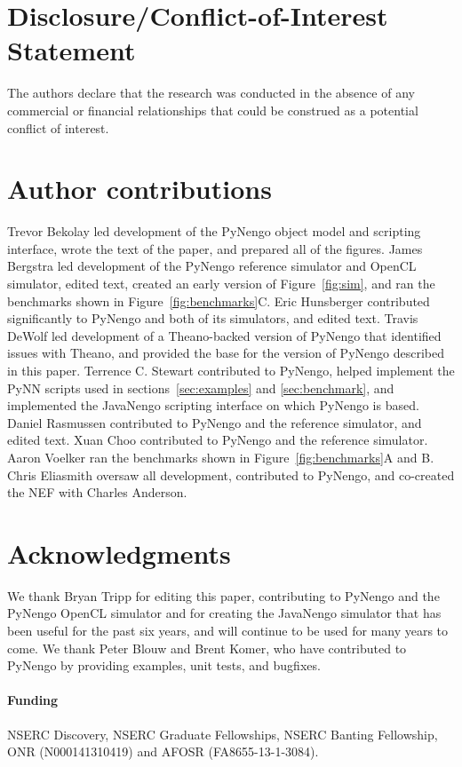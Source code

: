 \documentclass{frontiersSCNS}
\begin{document}
\section*{Disclosure/Conflict-of-Interest Statement}

The authors declare that the research was conducted in the absence of
any commercial or financial relationships that could be construed as a
potential conflict of interest.

\section*{Author contributions}

Trevor Bekolay led development of the
PyNengo object model and scripting interface,
wrote the text of the paper,
and prepared all of the figures.
James Bergstra led development of
the PyNengo reference simulator and OpenCL simulator,
edited text, created an early version
of Figure~\ref{fig:sim},
and ran the benchmarks shown in
Figure~\ref{fig:benchmarks}C.
Eric Hunsberger contributed significantly
to PyNengo and both of its simulators, and edited text.
Travis DeWolf led development
of a Theano-backed
version of PyNengo that
identified issues with Theano,
and provided the base for
the version of PyNengo described in this paper.
Terrence C. Stewart contributed
to PyNengo, helped implement
the PyNN scripts used in
sections~\ref{sec:examples} and \ref{sec:benchmark},
and implemented the JavaNengo scripting interface
on which PyNengo is based.
Daniel Rasmussen contributed
to PyNengo and the reference simulator,
and edited text.
Xuan Choo contributed to PyNengo
and the reference simulator.
Aaron Voelker ran the benchmarks
shown in Figure~\ref{fig:benchmarks}A and B.
Chris Eliasmith oversaw all development,
contributed to PyNengo,
and co-created the NEF with Charles Anderson.

\section*{Acknowledgments}

We thank Bryan Tripp
for editing this paper,
contributing to PyNengo
and the PyNengo OpenCL simulator
and for creating the JavaNengo simulator
that has been useful
for the past six years,
and will continue
to be used for many years to come.
We thank Peter Blouw and Brent Komer,
who have contributed
to PyNengo by providing examples,
unit tests, and bugfixes.

\paragraph{Funding\textcolon}
NSERC Discovery, NSERC Graduate Fellowships,
NSERC Banting Fellowship, ONR (N000141310419)
and AFOSR (FA8655-13-1-3084).



\end{document}
